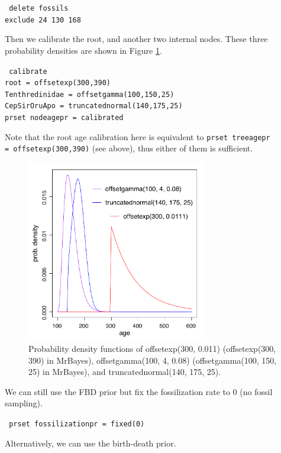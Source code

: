 \documentclass[12pt]{article}
\begin{document}
\medskip
{\tt \color{red} \noindent
delete fossils \\
exclude 24 130 168
}
\medskip

Then we calibrate the root, and another two internal nodes.
These three probability densities are shown in Figure \ref{fig_nodecali}.

\medskip
{\tt \color{red} \noindent
calibrate  \\
\indent root = offsetexp(300,390) \\
\indent Tenthredinidae = offsetgamma(100,150,25)   \\
\indent CepSirOruApo = truncatednormal(140,175,25) \\
prset nodeagepr = calibrated
}
\medskip

\noindent Note that the root age calibration here is equivalent to {\tt prset treeagepr \\ = offsetexp(300,390)} (see above), thus either of them is sufficient.

\begin{figure}[h]
\includegraphics[width=0.7\textwidth]{figures/nodecali.pdf}
\caption{Probability density functions of offsetexp(300, 0.011) (offsetexp(300, 390) in MrBayes), offsetgamma(100, 4, 0.08) (offsetgamma(100, 150, 25) in MrBayes), and truncatednormal(140, 175, 25).
}
\label{fig_nodecali}
\end{figure}

We can still use the FBD prior but fix the fossilization rate to 0 (no fossil sampling).

\medskip
{\tt \color{red} \noindent
prset fossilizationpr = fixed(0)
}
\medskip

\noindent Alternatively, we can use the birth-death prior.
\end{document}
